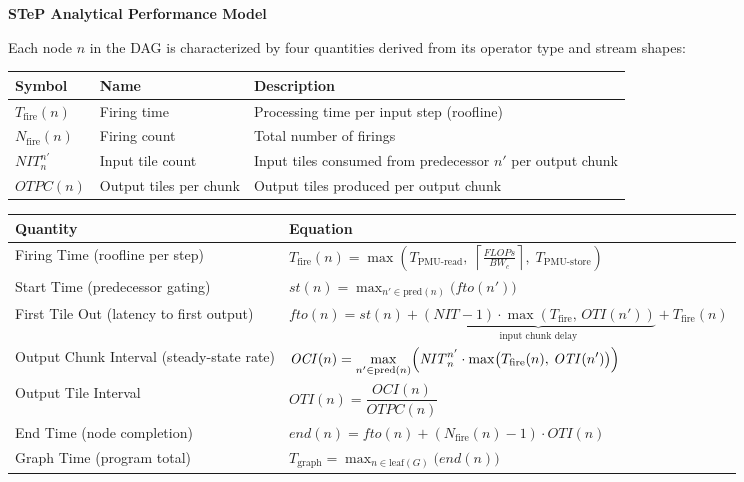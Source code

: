 \documentclass[11pt]{article}
\begin{document}
\begin{center}
\Large\textbf{STeP Analytical Performance Model}
\end{center}

\medskip

\small
Each node $n$ in the DAG is characterized by four quantities derived from its operator type and stream shapes:

\smallskip

\renewcommand{\arraystretch}{1.4}
\begin{tabular}{@{} l l l @{}}
\toprule
\textbf{Symbol} & \textbf{Name} & \textbf{Description} \\
\midrule
$T_{\text{fire}}(n)$ & Firing time & Processing time per input step (roofline) \\
$N_{\text{fire}}(n)$ & Firing count & Total number of firings \\
$\mathit{NIT}^{n'}_n$ & Input tile count & Input tiles consumed from predecessor $n'$ per output chunk \\
$\mathit{OTPC}(n)$ & Output tiles per chunk & Output tiles produced per output chunk \\
\bottomrule
\end{tabular}

\medskip
\normalsize

\renewcommand{\arraystretch}{2.2}
\begin{tabular}{@{} >{\raggedright}p{3.2cm} p{12.5cm} @{}}
\toprule
\textbf{Quantity} & \textbf{Equation} \\
\midrule
Firing Time \newline\small(roofline per step)
    & $T_{\text{fire}}(n) = \max\!\left(T_{\text{PMU-read}},\; \left\lceil\frac{\mathit{FLOPs}}{\mathit{BW}_c}\right\rceil,\; T_{\text{PMU-store}}\right)$ \\
Start Time \newline\small(predecessor gating)
    & $\mathit{st}(n) = \displaystyle\max_{n' \in \text{pred}(n)} \bigl(\mathit{fto}(n')\bigr)$ \\
First Tile Out \newline\small(latency to first output)
    & $\mathit{fto}(n) = \mathit{st}(n) + \underbrace{(\mathit{NIT} - 1) \cdot \max(T_{\text{fire}},\, \mathit{OTI}(n'))}_{\text{input chunk delay}} + T_{\text{fire}}(n)$ \\
Output Chunk Interval \newline\small(steady-state rate)
    & $\mathit{OCI}(n) = \displaystyle\max_{n' \in \text{pred}(n)} \Bigl(\mathit{NIT}^{n'}_n \cdot \max\bigl(T_{\text{fire}}(n),\, {\mathit{OTI}}(n')\bigr)\Bigr)$ \\
Output Tile Interval
    & $\mathit{OTI}(n) = \dfrac{\mathit{OCI}(n)}{\mathit{OTPC}(n)}$ \\
End Time \newline\small(node completion)
    & $\textit{end}(n) = \mathit{fto}(n) + \left(N_{\text{fire}}(n) - 1\right) \cdot \mathit{OTI}(n)$ \\
Graph Time \newline\small(program total)
    & $T_{\text{graph}} = \displaystyle\max_{n \in \text{leaf}(G)} \bigl(\textit{end}(n)\bigr)$ \\
\bottomrule
\end{tabular}
\end{document}
